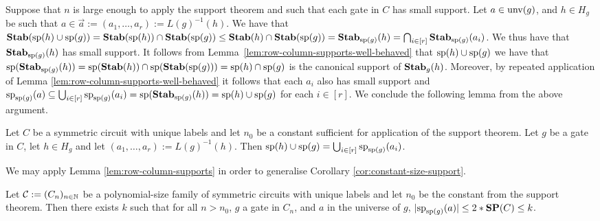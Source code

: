 \documentclass[../paper.tex]{subfiles}
\begin{document}

Suppose that $n$ is large enough to apply the support theorem and such that each
gate in $C$ has small support. Let $a \in \text{unv}(g)$, and $h \in H_g$ be such
that $a \in \vec{a} := (a_1, \ldots , a_r) := L(g)^{-1}(h)$. We have that
$\text{\textbf{Stab}}(\text{sp}(h) \cup \text{sp}(g)) = \text{\textbf{Stab}}(\text{sp}(h)) \cap \text{\textbf{Stab}}(\text{sp}(g)) \leq
\text{\textbf{Stab}}(h) \cap \text{\textbf{Stab}} (\text{sp} (g)) = \text{\textbf{Stab}}_{\text{sp}(g)}(h) = \bigcap_{i \in
  [r]}\text{\textbf{Stab}}_{\text{sp}(g)}(a_i)$. We thus have that $\text{\textbf{Stab}}_{\text{sp}(g)}(h)$ has
small support. It follows from Lemma~\ref{lem:row-column-supports-well-behaved}
that $\text{sp}(h) \cup \text{sp}(g)$ we have that $\text{sp}(\text{\textbf{Stab}}_{\text{sp}(g)}(h)) =
\text{sp}(\text{\textbf{Stab}}(h)) \cap \text{sp}(\text{\textbf{Stab}}(\text{sp}(g))) = \text{sp}(h) \cap \text{sp}(g)$ is
the canonical support of $\text{\textbf{Stab}}_g(h)$. Moreover, by repeated application of
Lemma \ref{lem:row-column-supports-well-behaved} it follows that each $a_i$ also
has small support and $\text{sp}_{\text{sp}(g)}(a) \subseteq \bigcup_{i \in
  [r]}\text{sp}_{\text{sp}(g)}(a_i) = \text{sp}(\text{\textbf{Stab}}_{\text{sp}(g)}(h)) = \text{sp}(h) \cup
\text{sp}(g)$ for each $i \in [r]$. We conclude the following lemma from the above
argument.

\begin{lem}
  Let $C$ be a symmetric circuit with unique labels and let $n_0$ be a constant
  sufficient for application of the support theorem. Let $g$ be a gate in $C$,
  let $h \in H_g$ and let $(a_1, \ldots, a_r) := L(g)^{-1}(h)$. Then $\text{sp}(h)
  \cup \text{sp}(g) = \bigcup_{i \in [r]} \text{sp}_{\text{sp}(g)}(a_i)$.
  \label{lem:row-column-supports}
\end{lem}

We may apply Lemma \ref{lem:row-column-supports} in order to generalise
Corollary \ref{cor:constant-size-support}.

\begin{cor}
  \label{cor:constant-size-support-for-everything}
  Let $\mathcal{C} := (C_n)_{n \in \mathbb{N}}$ be a polynomial-size family of
  symmetric circuits with unique labels and let $n_0$ be the constant from the
  support theorem. Then there exists $k$ such that for all $n > n_0$, $g$ a gate
  in $C_n$, and $a$ in the universe of $g$, $\vert \text{sp}_{\text{sp}(g)}(a) \vert
  \leq 2* \text{\textbf{SP}}(C) \leq k$.
\end{cor}

\end{document}
